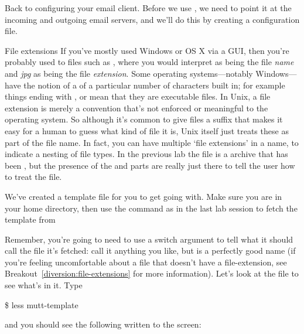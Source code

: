 Back to configuring your email client. Before we use , we need to point it at the incoming and outgoing email servers, and we'll do this by creating a configuration file.

\begin{diversion}{File extensions}
\label{diversion:file-extensions}
If you've mostly used Windows or OS X via a GUI, then you're probably used to files such as , where you would interpret  as being the file \textit{name} and \textit{jpg} as being the file \textit{extension}. Some operating systems---notably Windows---have the notion of a  of a particular number of characters built in; for example things ending with ,  or  mean that they are executable files. In Unix, a file extension is merely a convention that's not enforced or meaningful to the operating system. So although it's common to give files a suffix that makes it easy for a human to guess what kind of file it is, Unix itself just treats these as part of the file name. In fact, you can have multiple `file extensions' in a name, to indicate a nesting of file types. In the previous lab the file  is a  archive that has been , but the presence of the  and  parts are really just there to tell the user how to treat the file.
\end{diversion}

We've created a template file for you to get going with. Make sure you are in your home directory, then use the  command as in the last lab session to fetch the template from  \\


Remember, you're going to need to use a switch argument to tell  what it should call the file it's fetched: call it anything you like, but  is a perfectly good name (if you're feeling uncomfortable about a file that doesn't have a file-extension, see Breakout~\ref{diversion:file-extensions} for more information). Let's look at the file to see what's in it. Type

\begin{ttoutenv}
\$ less mutt-template
\end{ttoutenv}


and you should see the following written to the screen:
\begin{ttoutenv}

\end{ttoutenv}

